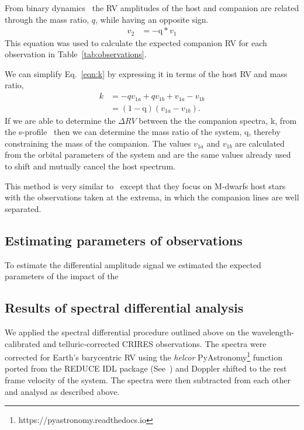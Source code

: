     From binary dynamics~\citep[e.g.][]{murray_keplerian_2010} the RV amplitudes of the host and companion are related through the mass ratio, \(q \), while having an opposite sign.
    \begin{align}
    v_{2}  &= -\textrm{q} * v_{1} \label{eqn:q_relation}
    \end{align}
    This equation was used to calculate the expected companion RV for each observation in Table~\ref{tab:observations}.

    We can simplify Eq.~\ref{eqn:k} by expressing it in terms of the host RV and mass ratio,
    \begin{align}
    k &= -q v_{1a} + q v_{1b} + v_{1a} - v_{1b} \nonumber \\
    &= (1 - \textrm{q})(v_{1a} - v_{1b}). \label{eqn:k_simplified}
    \end{align}
    If we are able to determine the \(\Delta RV \) between the the companion spectra, k, from the s-profile~\citep[see ][]{ferluga_separating_1997} then we can determine the mass ratio of the system, q, thereby constraining the mass of the companion. The values \(v_{1a} \) and \(v_{1b} \) are calculated from the orbital parameters of the system and are the same values already used to shift and mutually cancel the host spectrum.

    This method is very similar to~\citet{kostogryz_spectral_2013} except that they focus on M-dwarfs host stars with the observations taken at the extrema, in which the companion lines are well separated.

    \subsection{Estimating parameters of observations}
    To estimate the differential amplitude signal we estimated the expected parameters of the impact of the

    \subsection{Results of spectral differential analysis}

    \label{appendix:A2}
    We applied the spectral differential procedure outlined above on the wavelength-calibrated and telluric-corrected CRIRES observations. The spectra were corrected for Earth's barycentric RV using the \emph{helcor} PyAstronomy\footnote{https://pyastronomy.readthedocs.io} function ported from the REDUCE IDL package (See~\citet[][]{piskunov_new_2002}) and Doppler shifted to the rest frame velocity of the system. The spectra were then subtracted from each other and analysd as described above.

